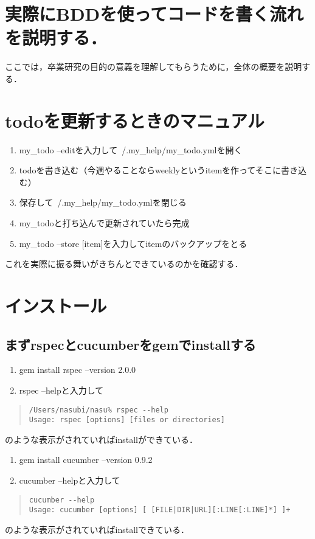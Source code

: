 \section{実際にBDDを使ってコードを書く流れを説明する．}
ここでは，卒業研究の目的の意義を理解してもらうために，全体の概要を説明する．

\section{todoを更新するときのマニュアル}
\begin{enumerate}
\item my\_todo --editを入力して~/.my\_help/my\_todo.ymlを開く
\item todoを書き込む（今週やることならweeklyというitemを作ってそこに書き込む）
\item 保存して~/.my\_help/my\_todo.ymlを閉じる
\item my\_todoと打ち込んで更新されていたら完成
\item my\_todo --store [item]を入力してitemのバックアップをとる
\end{enumerate}
これを実際に振る舞いがきちんとできているのかを確認する．

\section{インストール}
\subsection{まずrspecとcucumberをgemでinstallする}
\begin{enumerate}
\item gem install rspec --version 2.0.0
\item rspec --helpと入力して
\end{enumerate}\begin{quote}\begin{verbatim}
/Users/nasubi/nasu% rspec --help
Usage: rspec [options] [files or directories]
\end{verbatim}\end{quote}
のような表示がされていればinstallができている．

\begin{enumerate}
\item gem install cucumber --version 0.9.2
\item cucumber --helpと入力して
\end{enumerate}\begin{quote}\begin{verbatim}
cucumber --help
Usage: cucumber [options] [ [FILE|DIR|URL][:LINE[:LINE]*] ]+
\end{verbatim}\end{quote}
のような表示がされていればinstallできている．

